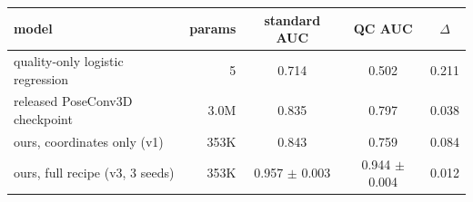 \begin{tabular}{lrccc}
\toprule
model & params & standard AUC & QC AUC & $\Delta$ \\
\midrule
quality-only logistic regression & 5 & 0.714 & 0.502 & 0.211 \\
released PoseConv3D checkpoint & 3.0M & 0.835 & 0.797 & 0.038 \\
ours, coordinates only (v1) & 353K & 0.843 & 0.759 & 0.084 \\
ours, full recipe (v3, 3 seeds) & 353K & 0.957 $\pm$ 0.003 & 0.944 $\pm$ 0.004 & 0.012 \\
\bottomrule
\end{tabular}
